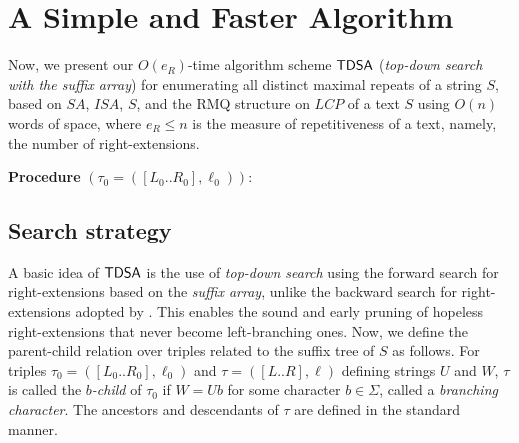 \section{A Simple and Faster Algorithm}
\label{sec:algo}
Now, we present our $O(e_R)$-time algorithm scheme $\textsf{TDSA}$ (\textit{top-down search with the suffix array}) for enumerating all distinct maximal repeats of a string $S$,  based on $SA$, $ISA$, $S$, and the RMQ structure on $LCP$ of a text $S$ using $O(n)$ words of space, where $e_R \le n$ is the measure of repetitiveness of a text, namely, the number of right-extensions.


{
  \setlength{\interspacetitleruled}{0pt}%
  \setlength{\algotitleheightrule}{0pt}%
  \begin{algorithm}[h]
  \textbf{Procedure} \TDSA$(\tau_0 = ([L_0..R_0], \ell_0))$:\\
  \end{algorithm}
}  

\subsection{Search strategy}
\label{sec:algo:tdsa}
A basic idea of $\textsf{TDSA}$ is the use of \textit{top-down search} using the forward search for right-extensions based on the \textit{suffix array}, unlike the backward search for right-extensions adopted by \TDBW.
This enables the sound and early pruning of hopeless right-extensions that never become left-branching ones.
Now, we define the parent-child relation over triples related to the suffix tree of $S$ as follows. For triples $\tau_0 = ([L_0..R_0], \ell_0)$ and $\tau = ([L..R], \ell)$ defining strings $U$ and $W$, $\tau$ is called the \textit{$b$-child} of $\tau_0$ if $W = Ub$ for some character $b \in \Sigma$, called a \textit{branching character}. The ancestors and descendants of $\tau$ are defined in the standard manner.

